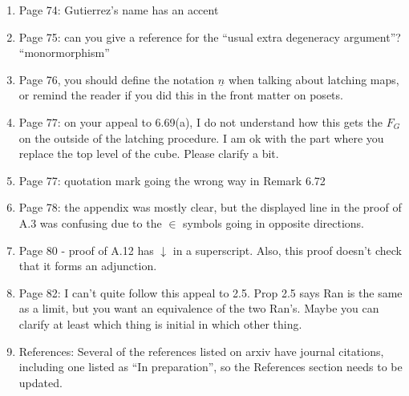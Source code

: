 \documentclass{article}
\begin{document}
\begin{enumerate}
\item
Page 74: Gutierrez's name has an accent

\item
Page 75: can you give a reference for the ``usual extra degeneracy argument''?
``monormorphism''

\item
Page 76, you should define the notation $\underline{n}$ when talking about latching maps, or remind the reader if you did this in the front matter on posets.

\item
Page 77: on your appeal to 6.69(a), I do not understand how this gets the $F_G$ on the outside of the latching procedure. I am ok with the part where you replace the top level of the cube. Please clarify a bit.

\item
Page 77: quotation mark going the wrong way in Remark 6.72

\item
Page 78: the appendix was mostly clear, but the displayed line in the proof of A.3 was confusing due to the $\in$ symbols going in opposite directions.

\item
Page 80 - proof of A.12 has $\downarrow$ in a superscript. Also, this proof doesn't check that it forms an adjunction.

\item
Page 82: I can't quite follow this appeal to 2.5. Prop 2.5 says Ran is the same as a limit, but you want an equivalence of the two Ran's. Maybe you can clarify at least which thing is initial in which other thing. 

\item
References:
Several of the references listed on arxiv have journal citations, including one listed as ``In preparation'', so the References section needs to be updated.



\end{enumerate}







{}


\end{document}
